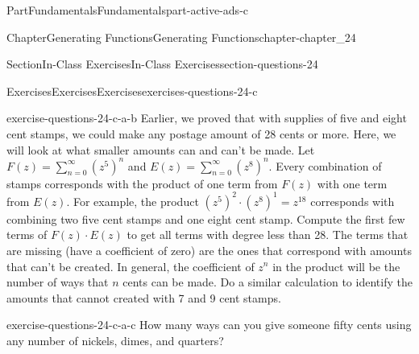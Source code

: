 \documentclass[oneside,10pt,]{book}
\numberwithin{equation}{section}
\begin{document}
\begin{partptx}{Part}{Fundamentals}{}{Fundamentals}{}{}{part-active-ads-c}
\begin{chapterptx}{Chapter}{Generating Functions}{}{Generating Functions}{}{}{chapter-chapter_24}
\begin{sectionptx}{Section}{In-Class Exercises}{}{In-Class Exercises}{}{}{section-questions-24}
\begin{exercises-subsection-numberless}{Exercises}{Exercises}{}{Exercises}{}{}{exercises-questions-24-c}
\begin{exercisegroup}
\begin{divisionexerciseeg}{2}{}{}{exercise-questions-24-c-a-b}
Earlier, we proved that with supplies of five and eight cent stamps, we could make any postage amount of 28 cents or more.  Here, we will look at what smaller amounts can and can't be made.  Let \(F(z)= \sum_{n=0}^{\infty} (z^{5})^n\) and \(E(z)=\sum_{n=0}^{\infty} (z^{8})^n\).  Every combination of stamps corresponds with the product of one term from \(F(z)\) with one term from \(E(z)\).  For example, the product \((z^{5})^{2}\cdot (z^{8})^1= z^{18}\)  corresponds with combining two five cent stamps and one eight cent stamp.  Compute the first few terms of \(F(z)\cdot E(z)\) to  get all terms with degree less than 28. The terms that are missing (have a coefficient of zero) are the ones that correspond with amounts that can't be created.  In general, the coefficient of \(z^n\) in the product will be the number of ways that \(n\) cents can be made. Do a similar calculation to identify the amounts that cannot created with 7 and 9 cent stamps.%
\end{divisionexerciseeg}%
\begin{divisionexerciseeg}{3}{}{}{exercise-questions-24-c-a-c}%
How many ways can you give someone fifty cents using any number of nickels, dimes, and quarters?%
\end{divisionexerciseeg}%
\end{exercisegroup}
\par\medskip\noindent
\end{exercises-subsection-numberless}
\end{sectionptx}
\end{chapterptx}
\end{partptx}
%
%
\typeout{************************************************}
\typeout{************************************************}
%
\end{document}
